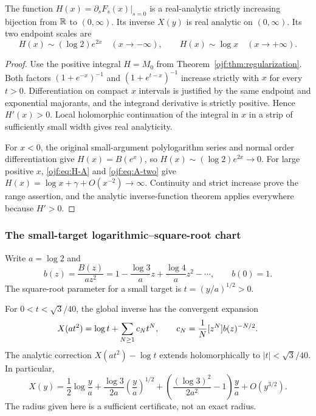 \begin{theorem}\label{ojf:thm:global}
The function $H(x)=\partial_sF_s(x)|_{s=0}$ is a real-analytic strictly
increasing bijection from $\mathbb R$ to $(0,\infty)$. Its inverse $X(y)$ is
real analytic on $(0,\infty)$. Its two endpoint scales are
\begin{equation}\label{ojf:eq:H-endpoints}
 H(x)\sim(\log2)e^{2x}\quad(x\to-\infty),\qquad
 H(x)\sim\log x\quad(x\to+\infty).
\end{equation}
\end{theorem}
\begin{proof}
Use the positive integral $H=M_0$ from
Theorem~\ref{ojf:thm:regularization}. Both factors
$(1+e^{-x})^{-1}$ and $(1+e^{t-x})^{-1}$ increase strictly with
$x$ for every $t>0$. Differentiation on compact $x$ intervals is
justified by the same endpoint and exponential majorants, and the
integrand derivative is strictly positive. Hence $H'(x)>0$.
Local holomorphic continuation of the integral in $x$ in a strip of
sufficiently small width gives real analyticity.

For $x<0$, the original small-argument polylogarithm series and normal
order differentiation give $H(x)=B(e^x)$, so
$H(x)\sim(\log2)e^{2x}\to0$. For large positive $x$,
\eqref{ojf:eq:H-A} and \eqref{ojf:eq:A-two} give
$H(x)=\log x+\gamma+O(x^{-2})\to\infty$.
Continuity and strict increase prove the range assertion, and the
analytic inverse-function theorem applies everywhere because $H'>0$.
\end{proof}

\subsubsection{The small-target logarithmic--square-root chart}
Write $a=\log2$ and
\begin{equation}\label{ojf:eq:small-b}
 b(z)=\frac{B(z)}{az^2}
       =1-\frac{\log3}{a}z+\frac{\log4}{a}z^2-\cdots,
 \qquad b(0)=1.
\end{equation}
The square-root parameter for a small target is
$t=(y/a)^{1/2}>0$.

\begin{theorem}
\label{ojf:thm:small-inverse}
For $0<t<\sqrt3/40$, the global inverse has the convergent expansion
\begin{equation}\label{ojf:eq:small-inverse}
 X(at^2)=\log t+\sum_{N\ge1}c_Nt^N,
 \qquad c_N=\frac1N[z^{N}]b(z)^{-N/2}.
\end{equation}
The analytic correction $X(at^2)-\log t$ extends holomorphically to
$|t|<\sqrt3/40$. In particular,
\begin{equation}\label{ojf:eq:small-first}
 X(y)=\frac12\log\frac ya+
     \frac{\log3}{2a}\left(\frac ya\right)^{1/2}
     +\left(\frac{(\log3)^2}{2a^2}-1\right)\frac ya
     +O(y^{3/2}).
\end{equation}
The radius given here is a sufficient certificate, not an exact radius.
\end{theorem}

